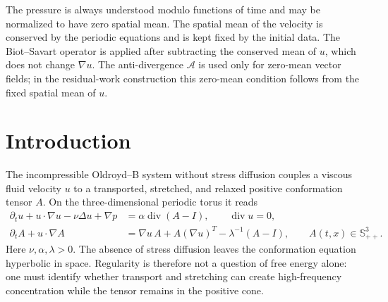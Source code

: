 \documentclass[11pt]{article}
\numberwithin{equation}{section}
\newcommand{\Id}{I}
\newcommand{\Spp}{\mathbb S_{++}}
\newcommand{\divv}{\operatorname{div}}
\newcommand{\calA}{\mathcal A}
\begin{document}
The pressure is always understood modulo functions of time and may be
normalized to have zero spatial mean.  The spatial mean of the velocity is
conserved by the periodic equations and is kept fixed by the initial data.
The Biot--Savart operator is applied after subtracting the conserved mean of
\(u\), which does not change \(\nabla u\).  The anti-divergence \(\calA\) is
used only for zero-mean vector fields; in the residual-work construction this
zero-mean condition follows from the fixed spatial mean of \(u\).

\section{Introduction}

The incompressible Oldroyd--B system without stress diffusion couples a viscous
fluid velocity \(u\) to a transported, stretched, and relaxed positive
conformation tensor \(A\).  On the three-dimensional periodic torus it reads
\begin{align}
  \partial_t u+u\cdot\nabla u-\nu\Delta u+\nabla p
  &=\alpha\divv(A-\Id),\qquad \divv u=0,
  \label{eq:momentum}\\
  \partial_t A+u\cdot\nabla A
  &=\nabla u\,A+A(\nabla u)^T-\lambda^{-1}(A-\Id),
  \qquad A(t,x)\in\Spp^3 .
  \label{eq:conf}
\end{align}
Here \(\nu,\alpha,\lambda>0\).  The absence of stress diffusion leaves the
conformation equation hyperbolic in space.  Regularity is therefore not a
question of free energy alone: one must identify whether transport and
stretching can create high-frequency concentration while the tensor remains in
the positive cone.
\end{document}
